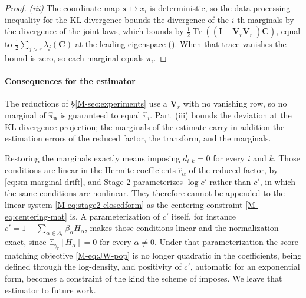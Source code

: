\documentclass[supplement,review,hidelinks,onefignum,onetabnum]{siamart251216}
\newcommand{\EE}{\mathbb{E}}
\newcommand{\tr}{\operatorname{Tr}}
\newcommand{\gauss}{\gamma}
\newcommand{\mC}{\bm{C}}
\newcommand{\mV}{\bm{V}}
\newcommand{\mI}{\bm{I}}
\newcommand{\vx}{\bm{x}}
\newcommand{\vn}{\bm{n}}
\begin{document}
\begin{proof}
\emph{(iii)} The coordinate map $\vx \mapsto x_i$ is deterministic, so the data-processing inequality for the KL divergence bounds the divergence of the $i$-th marginals by the divergence of the joint laws, which  bounds by $\tfrac12\tr((\mI - \mV_r\mV_r^\top)\mC)$, equal to $\tfrac12\sum_{j>r}\lambda_j(\mC)$ at the leading eigenspace (). When that trace vanishes the bound is zero, so each marginal equals $\pi_i$.
\end{proof}

\paragraph{Consequences for the estimator} The reductions of \S\ref{M-sec:experiments} use a $\mV_r$ with no vanishing row, so no marginal of $\widehat\pi_{\vn}$ is guaranteed to equal $\widehat\pi_i$. Part~(iii) bounds the deviation at the KL divergence projection; the marginals of the estimate carry in addition the estimation errors of the reduced factor, the transform, and the marginals.

Restoring the marginals exactly means imposing $d_{i,k} = 0$ for every $i$ and $k$. Those conditions are linear in the Hermite coefficients $\widehat c_\alpha$ of the reduced factor, by \eqref{eq:sm-marginal-drift}, and Stage 2 parameterizes $\log c'$ rather than $c'$, in which the same conditions are nonlinear. They therefore cannot be appended to the linear system \eqref{M-eq:stage2-closedform} as the centering constraint \eqref{M-eq:centering-mat} is. A parameterization of $c'$ itself, for instance $c' = 1 + \sum_{\alpha\in\Lambda_r}\beta_\alpha H_\alpha$, makes those conditions linear and the normalization exact, since $\EE_{\gauss_r}[H_\alpha] = 0$ for every $\alpha \neq 0$. Under that parameterization the score-matching objective \eqref{M-eq:JW-pop} is no longer quadratic in the coefficients, being defined through the log-density, and positivity of $c'$, automatic for an exponential form, becomes a constraint of the kind the scheme of  imposes. We leave that estimator to future work.


\end{document}
